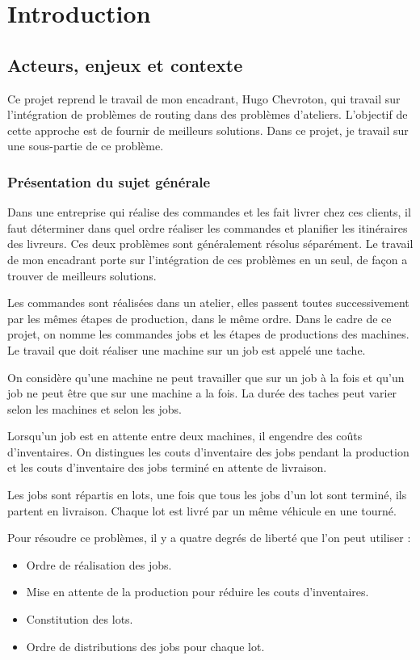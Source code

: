 \chapter{Introduction}

\section{Acteurs, enjeux et contexte}
Ce projet reprend le travail de mon encadrant, Hugo Chevroton, 
    qui travail sur l'intégration de problèmes de routing dans des problèmes d'ateliers.
    L'objectif de cette approche est de fournir de meilleurs solutions.
Dans ce projet, je travail sur une sous-partie de ce problème.

\subsection{Présentation du sujet générale}
Dans une entreprise qui réalise des commandes et les fait livrer chez ces clients,
    il faut déterminer dans quel ordre réaliser les commandes et planifier les itinéraires des livreurs.
Ces deux problèmes sont généralement résolus séparément.
Le travail de mon encadrant porte sur l'intégration de ces problèmes en un seul,
     de façon a trouver de meilleurs solutions.

Les commandes sont réalisées dans un atelier, 
    elles passent toutes successivement par les mêmes étapes de production, dans le même ordre.
Dans le cadre de ce projet, on nomme les commandes jobs et les étapes de productions des machines.
Le travail que doit réaliser une machine sur un job est appelé une tache.

On considère qu'une machine ne peut travailler que sur un job à la fois 
    et qu'un job ne peut être que sur une machine a la fois.
La durée des taches peut varier selon les machines et selon les jobs.

Lorsqu'un job est en attente entre deux machines, il engendre des coûts d'inventaires.
On distingues les couts d'inventaire des jobs pendant la production 
    et les couts d'inventaire des jobs terminé en attente de livraison.

Les jobs sont répartis en lots, une fois que tous les jobs d'un lot sont terminé, ils partent en livraison.
Chaque lot est livré par un même véhicule en une tourné.

Pour résoudre ce problèmes, il y a quatre degrés de liberté que l'on peut utiliser :
\begin{itemize}
    \item Ordre de réalisation des jobs.
    \item Mise en attente de la production pour réduire les couts d'inventaires.
    \item Constitution des lots.
    \item Ordre de distributions des jobs pour chaque lot.
\end{itemize}

